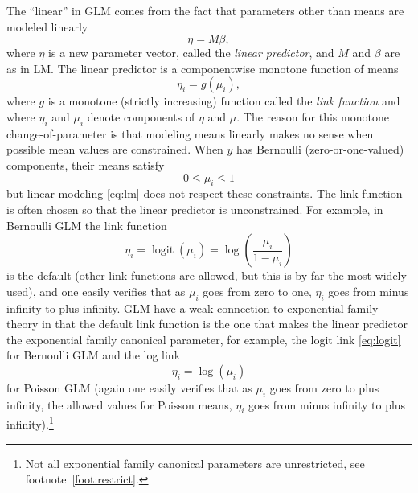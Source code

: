 \documentclass[11pt]{article}
\DeclareMathOperator{\logit}{logit}
\begin{document}
The ``linear'' in GLM comes from the fact that parameters other than means
are modeled linearly
\begin{equation} \label{eq:glm}
   \eta = M \beta,
\end{equation}
where $\eta$ is a new parameter vector, called the \emph{linear predictor},
and $M$ and $\beta$ are as in LM.  The linear predictor is a componentwise
monotone function of means
$$
   \eta_i = g(\mu_i),
$$
where $g$ is a monotone (strictly increasing) function called
the \emph{link function} and where $\eta_i$ and $\mu_i$ denote components
of $\eta$ and $\mu$.  The reason for this monotone change-of-parameter
is that modeling means linearly makes no sense when possible mean values are
constrained.  When $y$ has Bernoulli (zero-or-one-valued)
components, their means satisfy
$$
   0 \le \mu_i \le 1
$$
but linear modeling \eqref{eq:lm} does not respect these constraints.
The link function is often chosen so that the linear predictor is
unconstrained.  For example, in Bernoulli GLM the link function
\begin{equation} \label{eq:logit}
   \eta_i = \logit(\mu_i) = \log \left( \frac{\mu_i}{1 - \mu_i} \right)
\end{equation}
is the default (other link functions are allowed, but this is by far
the most widely used), and one easily verifies that as $\mu_i$ goes from
zero to one, $\eta_i$ goes from minus infinity to plus infinity.
GLM have a weak connection to exponential family theory in that the default
link function is the one that makes the linear predictor the exponential
family canonical parameter, for example, the logit link \eqref{eq:logit}
for Bernoulli GLM and the log link
$$
   \eta_i = \log(\mu_i)
$$
for Poisson GLM (again one easily verifies that as $\mu_i$ goes from zero to
plus infinity, the allowed values for Poisson means, $\eta_i$ goes from
minus infinity to plus infinity).\footnote{Not all exponential family
canonical parameters are unrestricted, see footnote~\ref{foot:restrict}.}
\end{document}
